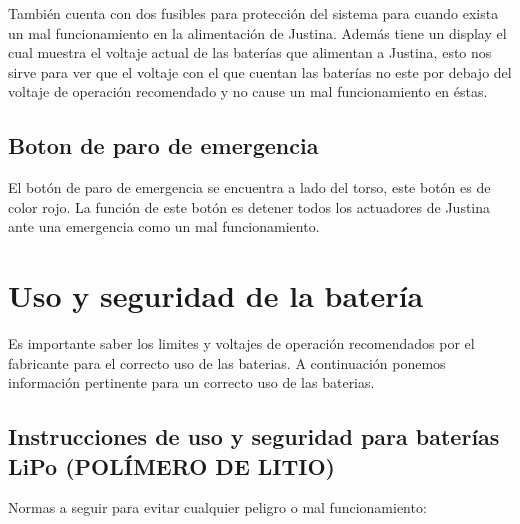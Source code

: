 \documentclass[user_manual.tex]{subfiles}
\begin{document}
También cuenta con dos fusibles para protección del sistema para cuando exista un mal funcionamiento en la alimentación de 
Justina. Además tiene un display el cual muestra el voltaje actual de las baterías que alimentan a Justina, esto nos sirve
para ver que el voltaje con el que cuentan las baterías no este por debajo del voltaje de operación recomendado y no cause
un mal funcionamiento en éstas.

\subsection{Boton de paro de emergencia}
El botón de paro de emergencia se encuentra a lado del torso, este botón es de color rojo. La función de este botón es 
detener todos los actuadores de Justina ante una emergencia como un mal funcionamiento.

\section{Uso y seguridad de la batería}

Es importante saber los limites y voltajes de operación recomendados por el fabricante para el correcto uso de las baterias. 
A continuación ponemos información pertinente para un correcto uso de las baterias.
\subsection{Instrucciones de uso y seguridad para baterías LiPo (POLÍMERO DE LITIO)}
Normas a seguir para evitar cualquier peligro o mal funcionamiento:
\end{document}
